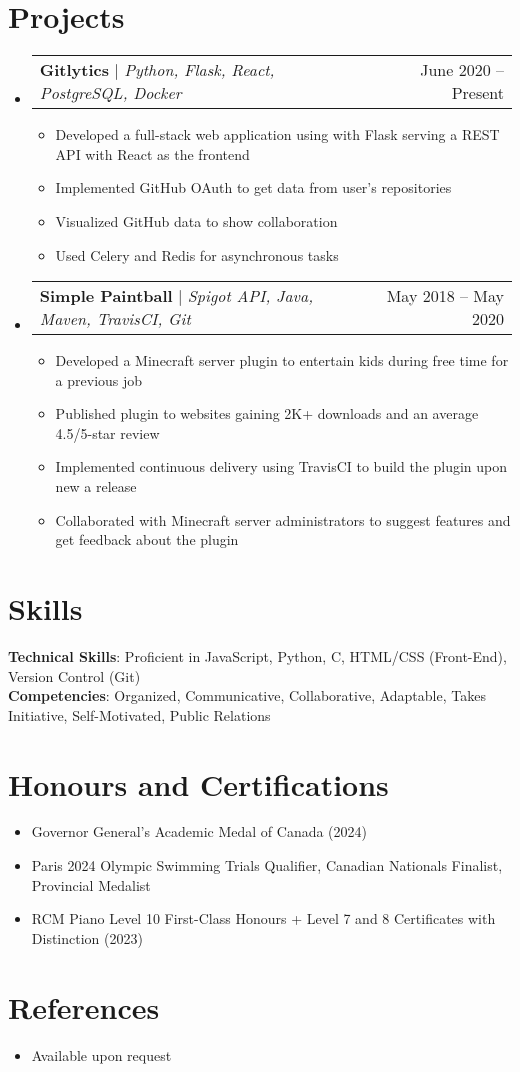 \documentclass[letterpaper,11pt]{article}
\makeatletter
\newcommand{\resumeItem}[1]{
  \item\small{
    {#1 \vspace{-2pt}}
  }
}
\newcommand{\resumeProjectHeading}[2]{
    \item
    \begin{tabular*}{0.97\textwidth}{l@{\extracolsep{\fill}}r}
      \small#1 & #2 \\
    \end{tabular*}\vspace{-7pt}
}
\newcommand{\resumeSubHeadingListStart}{\begin{itemize}[leftmargin=0.15in, label={}]}
\newcommand{\resumeSubHeadingListEnd}{\end{itemize}}
\newcommand{\resumeItemListStart}{\begin{itemize}}
\newcommand{\resumeItemListEnd}{\end{itemize}\vspace{-8pt}}
\makeatother
\begin{document}
\section{Projects}
    \resumeSubHeadingListStart
      \resumeProjectHeading
          {\textbf{Gitlytics} $|$ \emph{Python, Flask, React, PostgreSQL, Docker}}{June 2020 -- Present}
          \resumeItemListStart
            \resumeItem{Developed a full-stack web application using with Flask serving a REST API with React as the frontend}
            \resumeItem{Implemented GitHub OAuth to get data from user’s repositories}
            \resumeItem{Visualized GitHub data to show collaboration}
            \resumeItem{Used Celery and Redis for asynchronous tasks}
          \resumeItemListEnd
      \resumeProjectHeading
          {\textbf{Simple Paintball} $|$ \emph{Spigot API, Java, Maven, TravisCI, Git}}{May 2018 -- May 2020}
          \resumeItemListStart
            \resumeItem{Developed a Minecraft server plugin to entertain kids during free time for a previous job}
            \resumeItem{Published plugin to websites gaining 2K+ downloads and an average 4.5/5-star review}
            \resumeItem{Implemented continuous delivery using TravisCI to build the plugin upon new a release}
            \resumeItem{Collaborated with Minecraft server administrators to suggest features and get feedback about the plugin}
          \resumeItemListEnd
    \resumeSubHeadingListEnd



%
\section{Skills}
 \begin{itemize}[leftmargin=0.15in, label={}]
    \small{\item{
     \textbf{Technical Skills}{: Proficient in JavaScript, Python, C, HTML/CSS (Front-End), Version Control (Git)} \\
     \textbf{Competencies}{: Organized, Communicative, Collaborative, Adaptable, Takes Initiative, Self-Motivated, Public Relations}
    }}
 \end{itemize}

\section{Honours and Certifications}
  \resumeItemListStart
    \vspace{-2pt}\resumeItem{Governor General's Academic Medal of Canada (2024)}
    \vspace{-2pt}\resumeItem{Paris 2024 Olympic Swimming Trials Qualifier, Canadian Nationals Finalist, Provincial Medalist}
    \vspace{-2pt}\resumeItem{RCM Piano Level 10 First-Class Honours + Level 7 and 8 Certificates with Distinction (2023)}
  \resumeItemListEnd
\vspace{-2pt}

\section{References}
  \resumeItemListStart
    \resumeItem{Available upon request}
  \resumeItemListEnd

\end{document}
